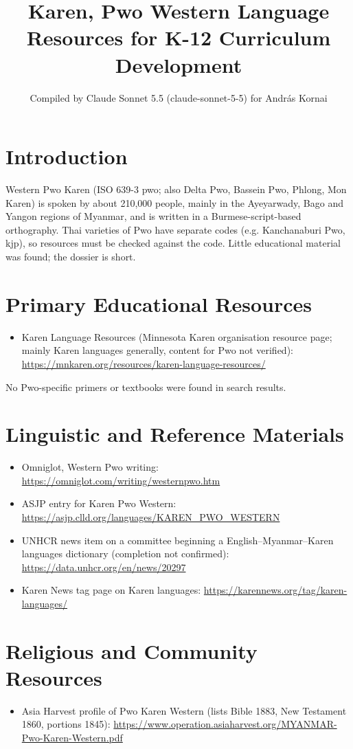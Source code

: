 \documentclass[12pt]{article}
\title{Karen, Pwo Western Language Resources for K-12 Curriculum Development}
\author{Compiled by Claude Sonnet 5.5 (claude-sonnet-5-5) for Andr\'as Kornai}
\date{}
\begin{document}
\maketitle

\section{Introduction}
Western Pwo Karen (ISO 639-3 pwo; also Delta Pwo, Bassein Pwo, Phlong, Mon Karen) is spoken by about 210,000 people, mainly in the Ayeyarwady, Bago and Yangon regions of Myanmar, and is written in a Burmese-script-based orthography. Thai varieties of Pwo have separate codes (e.g. Kanchanaburi Pwo, kjp), so resources must be checked against the code. Little educational material was found; the dossier is short.

\section{Primary Educational Resources}
\begin{itemize}
\item Karen Language Resources (Minnesota Karen organisation resource page; mainly Karen languages generally, content for Pwo not verified): \url{https://mnkaren.org/resources/karen-language-resources/}
\end{itemize}
No Pwo-specific primers or textbooks were found in search results.

\section{Linguistic and Reference Materials}
\begin{itemize}
\item Omniglot, Western Pwo writing: \url{https://omniglot.com/writing/westernpwo.htm}
\item ASJP entry for Karen Pwo Western: \url{https://asjp.clld.org/languages/KAREN_PWO_WESTERN}
\item UNHCR news item on a committee beginning a English--Myanmar--Karen languages dictionary (completion not confirmed): \url{https://data.unhcr.org/en/news/20297}
\item Karen News tag page on Karen languages: \url{https://karennews.org/tag/karen-languages/}
\end{itemize}

\section{Religious and Community Resources}
\begin{itemize}
\item Asia Harvest profile of Pwo Karen Western (lists Bible 1883, New Testament 1860, portions 1845): \url{https://www.operation.asiaharvest.org/MYANMAR-Pwo-Karen-Western.pdf}
\end{itemize}
\end{document}
